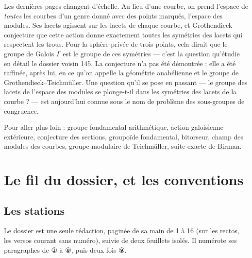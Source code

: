 \documentclass[11pt,a4paper]{article}
\begin{document}
\begin{resume}
Les dernières pages changent d'échelle. Au lieu d'une courbe, on prend
l'espace de \emph{toutes} les courbes d'un genre donné avec des points
marqués, l'espace des modules. Ses lacets agissent sur les lacets de chaque
courbe, et Grothendieck conjecture que cette action donne exactement toutes
les symétries des lacets qui respectent les trous. Pour la sphère privée de
trois points, cela dirait que le groupe de Galois $\Gamma$ est le groupe de
ces symétries — c'est la question qu'étudie en détail le dossier voisin 145.
La conjecture n'a pas été démontrée ; elle a été raffinée, après lui, en ce
qu'on appelle la géométrie anabélienne et le groupe de
Grothendieck--Teichmüller. Une question qu'il se pose en passant — le groupe
des lacets de l'espace des modules se plonge-t-il dans les symétries des
lacets de la courbe ? — est aujourd'hui connue sous le nom de problème des
sous-groupes de congruence.

Pour aller plus loin : groupe fondamental arithmétique, action galoisienne
extérieure, conjecture des sections, groupoïde fondamental, bitorseur, champ
des modules des courbes, groupe modulaire de Teichmüller, suite exacte de
Birman.

\end{resume}

\section*{Le fil du dossier, et les conventions}

\subsection*{Les stations}

Le dossier est une seule rédaction, paginée de sa main de 1 à 16 (sur les
rectos, les versos courant sans numéro), suivie de deux feuillets isolés. Il
numérote ses paragraphes de ① à ⑧, puis deux fois ⑨.
\end{document}
